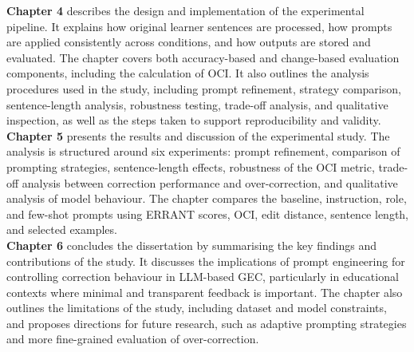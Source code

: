\textbf{Chapter 4} describes the design and implementation of the experimental pipeline. It explains how original learner sentences are processed, how prompts are applied consistently across conditions, and how outputs are stored and evaluated. The chapter covers both accuracy-based and change-based evaluation components, including the calculation of OCI. It also outlines the analysis procedures used in the study, including prompt refinement, strategy comparison, sentence-length analysis, robustness testing, trade-off analysis, and qualitative inspection, as well as the steps taken to support reproducibility and validity.\\

\textbf{Chapter 5} presents the results and discussion of the experimental study. The analysis is structured around six experiments: prompt refinement, comparison of prompting strategies, sentence-length effects, robustness of the OCI metric, trade-off analysis between correction performance and over-correction, and qualitative analysis of model behaviour. The chapter compares the baseline, instruction, role, and few-shot prompts using ERRANT scores, OCI, edit distance, sentence length, and selected examples.\\

\textbf{Chapter 6} concludes the dissertation by summarising the key findings and contributions of the study. It discusses the implications of prompt engineering for controlling correction behaviour in LLM-based GEC, particularly in educational contexts where minimal and transparent feedback is important. The chapter also outlines the limitations of the study, including dataset and model constraints, and proposes directions for future research, such as adaptive prompting strategies and more fine-grained evaluation of over-correction.\\
